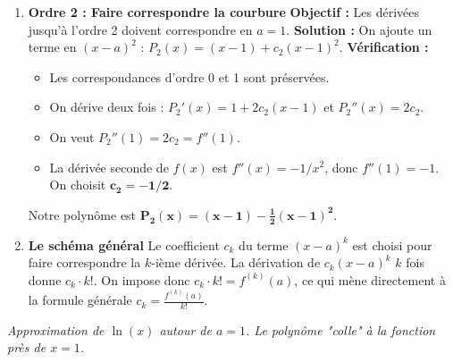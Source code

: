 \begin{intuitionbox}
\begin{enumerate}
    \item \textbf{Ordre 2 : Faire correspondre la courbure}
    \newline
    \textbf{Objectif :} Les dérivées jusqu'à l'ordre 2 doivent correspondre en $a=1$.
    \newline
    \textbf{Solution :} On ajoute un terme en $(x-a)^2$ : $P_2(x) = (x-1) + c_2 (x-1)^2$.
    \newline
    \textbf{Vérification :}
    \begin{itemize}
        \item Les correspondances d'ordre 0 et 1 sont préservées.
        \item On dérive deux fois : $P_2'(x) = 1 + 2c_2(x-1)$ et $P_2''(x) = 2c_2$.
        \item On veut $P_2''(1) = 2c_2 = f''(1)$.
        \item La dérivée seconde de $f(x)$ est $f''(x) = -1/x^2$, donc $f''(1)=-1$. On choisit $\mathbf{c_2 = -1/2}$.
    \end{itemize}
    Notre polynôme est $\mathbf{P_2(x) = (x-1) - \frac{1}{2}(x-1)^2}$.

    \item \textbf{Le schéma général}
    \newline
    Le coefficient $c_k$ du terme $(x-a)^k$ est choisi pour faire correspondre la $k$-ième dérivée. La dérivation de $c_k(x-a)^k$ $k$ fois donne $c_k \cdot k!$. On impose donc $c_k \cdot k! = f^{(k)}(a)$, ce qui mène directement à la formule générale $c_k = \frac{f^{(k)}(a)}{k!}$.
\end{enumerate}

\tcblower
\centering
{}
\par\small\textit{Approximation de $\ln(x)$ autour de $a=1$. Le polynôme "colle" à la fonction près de $x=1$.}
\end{intuitionbox}


